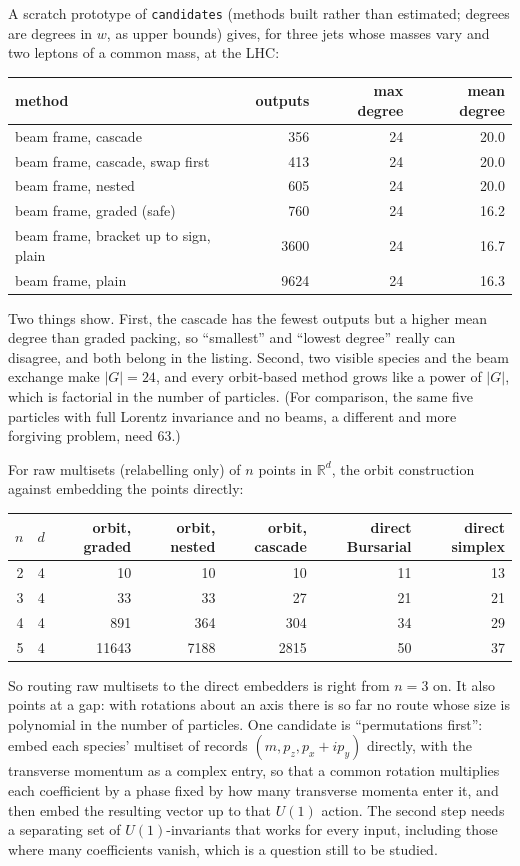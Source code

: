 \documentclass[11pt]{article}
\theoremstyle{definition}
\theoremstyle{remark}
\begin{document}
A scratch prototype of \texttt{candidates} (methods built rather than
estimated; degrees are degrees in $w$, as upper bounds) gives, for three jets
whose masses vary and two leptons of a common mass, at the LHC:
\begin{center}
\small
\begin{tabular}{lrrr}
  method & outputs & max degree & mean degree \\ \hline
  beam frame, cascade                      & 356  & 24 & 20.0 \\
  beam frame, cascade, swap first          & 413  & 24 & 20.0 \\
  beam frame, nested                       & 605  & 24 & 20.0 \\
  beam frame, graded (safe)                & 760  & 24 & 16.2 \\
  beam frame, bracket up to sign, plain    & 3600 & 24 & 16.7 \\
  beam frame, plain                        & 9624 & 24 & 16.3
\end{tabular}
\end{center}
Two things show. First, the cascade has the fewest outputs but a higher mean
degree than graded packing, so ``smallest'' and ``lowest degree'' really can
disagree, and both belong in the listing. Second, two visible species and the
beam exchange make $|G| = 24$, and every orbit-based method grows like a power
of $|G|$, which is factorial in the number of particles. (For comparison, the
same five particles with full Lorentz invariance and no beams, a different and
more forgiving problem, need 63.)

For raw multisets (relabelling only) of $n$ points in $\mathbb{R}^d$, the orbit
construction against embedding the points directly:
\begin{center}
\small
\begin{tabular}{rrrrrrr}
  $n$ & $d$ & orbit, graded & orbit, nested & orbit, cascade & direct Bursarial & direct simplex \\ \hline
  2 & 4 & 10    & 10   & 10   & 11 & 13 \\
  3 & 4 & 33    & 33   & 27   & 21 & 21 \\
  4 & 4 & 891   & 364  & 304  & 34 & 29 \\
  5 & 4 & 11643 & 7188 & 2815 & 50 & 37
\end{tabular}
\end{center}
So routing raw multisets to the direct embedders is right from $n = 3$ on. It
also points at a gap: with rotations about an axis there is so far no route
whose size is polynomial in the number of particles. One candidate is
``permutations first'': embed each species' multiset of records $(m, p_z,
p_x + i p_y)$ directly, with the transverse momentum as a complex entry, so that
a common rotation multiplies each coefficient by a phase fixed by how many
transverse momenta enter it, and then embed the resulting vector up to that
$U(1)$ action. The second step needs a separating set of $U(1)$-invariants that
works for every input, including those where many coefficients vanish, which is
a question still to be studied.
\end{document}
